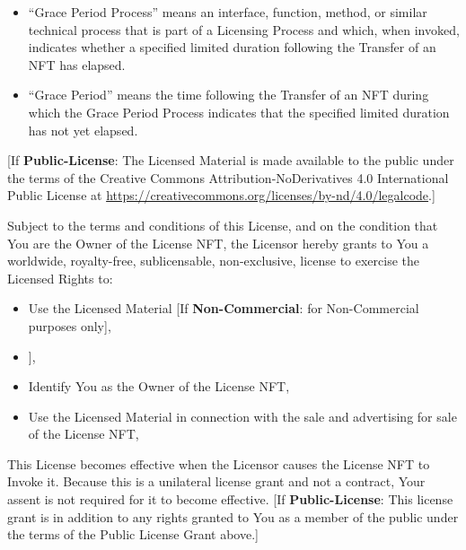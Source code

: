 \documentclass{article}
\newcommand{\keyword}[1]{\textbf{#1}\xspace}
\newcommand{\publiclicense}{\keyword{Public-License}}
\newcommand{\noncommercial}{\keyword{Non-Commercial}}
\newcommand{\noderivative}{\keyword{No-Derivatives}}
\newcommand{\sharealike}{\keyword{Share-Alike}}
\newcommand{\derivativetracking}{\keyword{Derivative-Tracking}}
\newcommand{\sect}[1]{\vspace{12pt}\noindent{\strong{#1}}}
\newcommand{\iflicenseoption}[2]{[\colorbox{light-gray}{If #1:} #2]}
\newcommand{\ifnotlicenseoption}[2]{[\colorbox{light-gray}{Unless #1:} #2]}
\begin{document}
\begin{sffamily}
\begin{itemize}
	\item ``Grace Period Process'' means an interface, function, method, or similar technical process that is part of a Licensing Process and which, when invoked, indicates whether a specified limited duration following the Transfer of an NFT has elapsed.
	
	\item ``Grace Period'' means the time following the Transfer of an NFT during which the Grace Period Process indicates that the specified limited duration has not yet elapsed.
	
	\end{itemize}


\sect{Public License Grant}

\iflicenseoption{\publiclicense}{The Licensed Material is made available to the public under the terms of the Creative Commons Attribution-NoDerivatives 4.0 International Public License at \href{https://creativecommons.org/licenses/by-nd/4.0/legalcode}{https://creativecommons.org/licenses/by-nd/4.0/legalcode}.}

\sect{NFT License Grant}

Subject to the terms and conditions of this License, and on the condition that You are the Owner of the License NFT, the Licensor hereby grants to You a worldwide, royalty-free, sublicensable, non-exclusive, license to exercise the Licensed Rights to:
\begin{itemize}
\item Use the Licensed Material \iflicenseoption{\noncommercial}{for Non-Commercial purposes only},
\item \ifnotlicenseoption{\noderivative}{Create and Use Adapted Material \iflicenseoption{\noncommercial}{for Non-Commercial purposes only} \iflicenseoption{\derivativetracking}{provided that the Adapted Material is Derivative Tracked from the License NFT} \iflicenseoption{\sharealike}{provided that the Adapted Material is Share-Alike Sublicensed from the License NFT}},
\item Identify You as the Owner of the License NFT,
\item Use the Licensed Material in connection with the sale and advertising for sale of the License NFT,
\end{itemize}
This License becomes effective when the Licensor causes the License NFT to Invoke it. Because this is a unilateral license grant and not a contract, Your assent is not required for it to become effective. \iflicenseoption{\publiclicense}{This license grant is in addition to any rights granted to You as a member of the public under the terms of the Public License Grant above.}


\end{sffamily}
\end{document}
